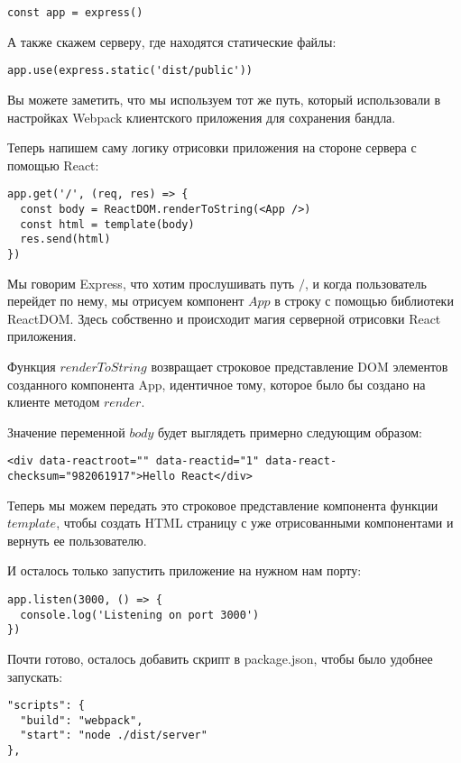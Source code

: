 \begin{lstlisting}
const app = express()
\end{lstlisting}

А также скажем серверу, где находятся статические файлы:

\begin{lstlisting}
app.use(express.static('dist/public'))
\end{lstlisting}

Вы можете заметить, что мы используем тот же путь, который использовали в настройках Webpack клиентского приложения для сохранения бандла. 

Теперь напишем саму логику отрисовки приложения на стороне сервера с помощью React:


\begin{lstlisting}
app.get('/', (req, res) => {
  const body = ReactDOM.renderToString(<App />)
  const html = template(body)
  res.send(html)
})
\end{lstlisting}

Мы говорим Express, что хотим прослушивать путь $/$, и когда пользователь перейдет по нему, мы отрисуем компонент $App$ в строку с помощью библиотеки ReactDOM. Здесь собственно и происходит магия серверной отрисовки React приложения.

Функция $renderToString$ возвращает строковое представление DOM элементов созданного компонента App, идентичное тому, которое было бы создано на клиенте методом $render$.

Значение переменной $body$ будет выглядеть примерно следующим образом:

\begin{lstlisting}
<div data-reactroot="" data-reactid="1" data-react-checksum="982061917">Hello React</div>
\end{lstlisting}

Теперь мы можем передать это строковое представление компонента функции $template$, чтобы создать HTML страницу с уже отрисованными компонентами и вернуть ее пользователю.

И осталось только запустить приложение на нужном нам порту:

\begin{lstlisting}
app.listen(3000, () => {
  console.log('Listening on port 3000')
})
\end{lstlisting}

Почти готово, осталось добавить скрипт в package.json, чтобы было удобнее запускать:

\begin{lstlisting}
"scripts": {
  "build": "webpack",
  "start": "node ./dist/server"
},
\end{lstlisting}

